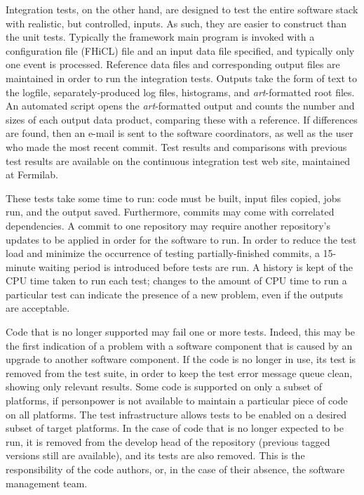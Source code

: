 Integration tests, on the other hand, are designed to test the entire software stack with realistic, but controlled,
inputs.  As such, they are easier to construct than the unit tests.  Typically the framework main program is invoked
with a configuration file (FHiCL) file and an input data file specified, and typically only one event
is processed.  Reference data files and corresponding
output files are maintained in order to run the integration tests.  Outputs take the form of text to the logfile,
separately-produced log files, histograms, and {\it{art}}-formatted root files.  An automated script opens the
{\it{art}}-formatted output and counts the number and sizes of each output data product, comparing these with
a reference.  If differences are found, then an e-mail is sent to the software coordinators, as well as the
user who made the most recent commit.  Test results and comparisons with previous test results are available
on the continuous integration test web site, maintained at Fermilab.

These tests take some time to run: code must be built, input files copied, jobs run, and the output saved.  Furthermore,
commits may come with correlated dependencies.  A commit to one repository may require another repository's updates
to be applied in order for the software to run.  In order to reduce the test load and minimize the occurrence of
testing partially-finished commits, a 15-minute waiting period is introduced before tests are run.  A history
is kept of the CPU time taken to run each test; changes to the amount of CPU time to run a particular test can
indicate the presence of a new problem, even if the outputs are acceptable.

Code that is no longer supported may fail one or more tests.  Indeed, this may be the first indication of 
a problem with a software component that is caused by an upgrade to another software component.  If the code
is no longer in use, its test is removed from the test suite, in order to keep the test error message queue clean,
showing only relevant results.  Some code is supported on only a subset of platforms, if personpower is not
available to maintain a particular piece of code on all platforms.  The test infrastructure allows tests to
be enabled on a desired subset of target platforms.  In the case of code that is no longer expected to be run,
it is removed from the develop head of the repository (previous tagged versions still are available), and its
tests are also removed.  This is the responsibility of the code authors, or, in the case of their absence,
the software management team.

